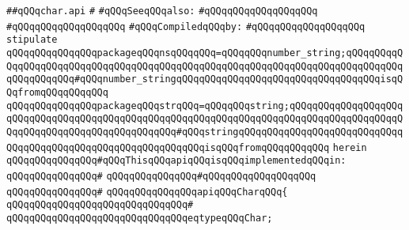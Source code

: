 \label{src/lib/std/src/char.api}
\verb|##qQQqchar.api|\newline
\verb|#|\newline
\verb|#qQQqSeeqQQqalso:|\newline
\verb|#qQQqqQQqqQQqqQQqqQQq|\newline
\verb|#qQQqqQQqqQQqqQQqqQQq|\newline
\newline
\verb|#qQQqCompiledqQQqby:|\newline
\verb|#qQQqqQQqqQQqqQQqqQQq|\newline
\newline
\newline
\verb|stipulate|\newline
\verb|qQQqqQQqqQQqqQQqpackageqQQqnsqQQqqQQq=qQQqqQQqnumber_string;qQQqqQQqqQQqqQQqqQQqqQQqqQQqqQQqqQQqqQQqqQQqqQQqqQQqqQQqqQQqqQQqqQQqqQQqqQQqqQQqqQQqqQQqqQQq#qQQqnumber_stringqQQqqQQqqQQqqQQqqQQqqQQqqQQqqQQqqQQqisqQQqfromqQQqqQQqqQQq|\newline
\verb|qQQqqQQqqQQqqQQqpackageqQQqstrqQQq=qQQqqQQqstring;qQQqqQQqqQQqqQQqqQQqqQQqqQQqqQQqqQQqqQQqqQQqqQQqqQQqqQQqqQQqqQQqqQQqqQQqqQQqqQQqqQQqqQQqqQQqqQQqqQQqqQQqqQQqqQQqqQQqqQQq#qQQqstringqQQqqQQqqQQqqQQqqQQqqQQqqQQqqQQqqQQqqQQqqQQqqQQqqQQqqQQqqQQqqQQqisqQQqfromqQQqqQQqqQQq|\newline
\verb|herein|\newline
\newline
\verb|qQQqqQQqqQQqqQQq#qQQqThisqQQqapiqQQqisqQQqimplementedqQQqin:|\newline
\verb|qQQqqQQqqQQqqQQq#|\newline
\verb|qQQqqQQqqQQqqQQq#qQQqqQQqqQQqqQQqqQQq|\newline
\verb|qQQqqQQqqQQqqQQq#|\newline
\verb|qQQqqQQqqQQqqQQqapiqQQqCharqQQq{|\newline
\verb|qQQqqQQqqQQqqQQqqQQqqQQqqQQqqQQq#|\newline
\verb|qQQqqQQqqQQqqQQqqQQqqQQqqQQqqQQqeqtypeqQQqChar;|\newline
